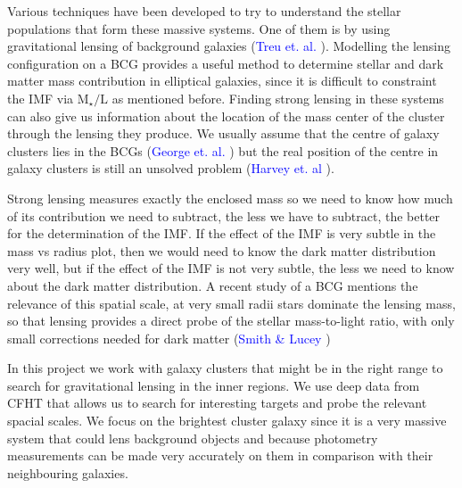 Various techniques have been developed to try to understand the stellar populations that form these massive systems. One of them is by using gravitational lensing  of  background galaxies (\textcolor{blue}{Treu et. al.} \citeyear{Reference1}). Modelling the lensing configuration on a BCG provides a useful method to determine stellar and dark matter mass contribution in elliptical galaxies, since it is difficult to constraint the IMF via $\textrm{M}_{\star}/\text{L}$ as mentioned before. Finding strong lensing in these systems can also give us information about the location of the mass center of the cluster through the lensing they produce. We usually assume that the centre of galaxy clusters lies in the BCGs (\textcolor{blue}{George et. al.} \citeyear{Reference18}) but the real position of the centre in galaxy clusters is still an unsolved problem (\textcolor{blue}{Harvey et. al} \citeyear{Reference13}). 

Strong lensing measures exactly the enclosed mass so we need to know how much of its contribution we need to subtract, the less we have to subtract, the better for the determination of the IMF. If the effect of the IMF is very subtle in the mass vs radius plot, then we would need to know the dark matter distribution very well, but if the effect of the IMF is not very subtle, the less we need to know about the dark matter distribution. A recent study of a BCG mentions the relevance of this spatial scale, at very small radii stars dominate the lensing mass, so that lensing provides a direct probe of the stellar mass-to-light ratio, with only small corrections needed for dark matter (\textcolor{blue}{Smith \& Lucey} \citeyear{Reference7}) 

In this project we work with galaxy clusters that might be in the right range to search for gravitational lensing in the inner regions. We use deep data from CFHT that allows us to search for interesting targets and probe the relevant spacial scales. We focus on the brightest cluster galaxy since it is a very massive system that could lens background objects and because photometry measurements can be made very accurately on them in comparison with their neighbouring galaxies. 

